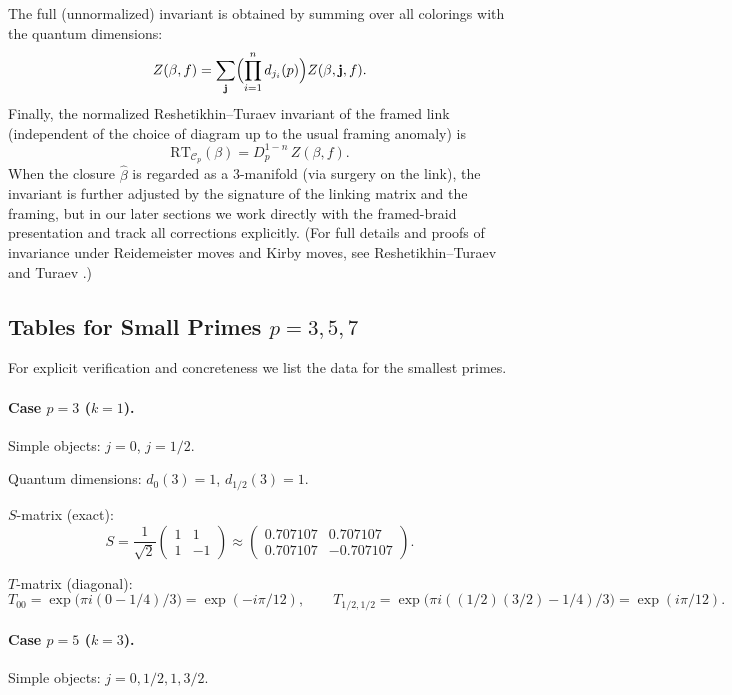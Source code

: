 The full (unnormalized) invariant is obtained by summing over all colorings with the quantum dimensions:
\[
Z(\beta, f) = \sum_{\mathbf{j}} \Bigl( \prod_{i=1}^n d_{j_i}(p) \Bigr) Z(\beta, \mathbf{j}, f).
\]
Finally, the normalized Reshetikhin--Turaev invariant of the framed link (independent of the choice of diagram up to the usual framing anomaly) is
\[
\mathrm{RT}_{\mathcal{C}_p}(\beta) = D_p^{1-n} \, Z(\beta, f).
\]
When the closure \(\hat{\beta}\) is regarded as a 3-manifold (via surgery on the link), the invariant is further adjusted by the signature of the linking matrix and the framing, but in our later sections we work directly with the framed-braid presentation and track all corrections explicitly. (For full details and proofs of invariance under Reidemeister moves and Kirby moves, see Reshetikhin--Turaev \cite{ReshetikhinTuraev1991} and Turaev \cite{Turaev1994}.)

\subsection{Tables for Small Primes \(p=3,5,7\)}

For explicit verification and concreteness we list the data for the smallest primes.

\paragraph{Case \(p=3\) (\(k=1\)).} Simple objects: \(j=0\), \(j=1/2\).

Quantum dimensions: \(d_0(3)=1\), \(d_{1/2}(3)=1\).

\(S\)-matrix (exact):
\[
S = \frac{1}{\sqrt{2}} \begin{pmatrix}
1 & 1 \\
1 & -1
\end{pmatrix}
\approx \begin{pmatrix}
0.707107 & 0.707107 \\
0.707107 & -0.707107
\end{pmatrix}.
\]

\(T\)-matrix (diagonal):
\[
T_{00} = \exp\bigl(\pi i (0 - 1/4)/3\bigr) = \exp(-i \pi /12),\qquad
T_{1/2,1/2} = \exp\bigl(\pi i ( (1/2)(3/2) - 1/4 )/3 \bigr) = \exp(i \pi /12).
\]

\paragraph{Case \(p=5\) (\(k=3\)).} Simple objects: \(j=0, 1/2, 1, 3/2\).

